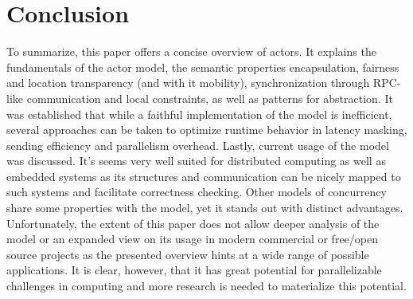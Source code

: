 \documentclass[A4]{article}
\begin{document}
\section{Conclusion}
\label{conclusion}
To summarize, this paper offers a concise overview of actors. It explains the fundamentals of the actor model, the semantic properties encapsulation, fairness and location transparency (and with it mobility), synchronization through RPC-like communication and local constraints, as well as patterns for abstraction. 
It was established that while a faithful implementation of the model is inefficient, several approaches can be taken to optimize runtime behavior in latency masking, sending efficiency and parallelism overhead.
Lastly, current usage of the model was discussed. It's seems very well suited for distributed computing as well as embedded systems as its structures and communication can be nicely mapped to such systems and facilitate correctness checking. 
Other models of concurrency share some properties with the model, yet it stands out with distinct advantages. 
Unfortunately, the extent of this paper does not allow deeper analysis of the model or an expanded view on its usage in modern commercial or free/open source projects as the presented overview hints at a wide range of possible applications. It is clear, however, that it has great potential for parallelizable challenges in computing and more research is needed to materialize this potential.


\nocite{Agha2016,conf/eef/RenA96,WikiLang}%




\end{document}

